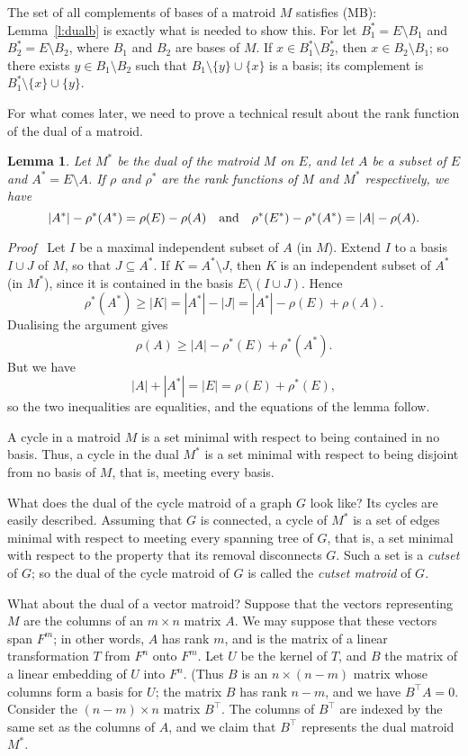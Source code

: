\documentclass[12pt]{article}
\newtheorem{lemma}[theorem]{Lemma}
\newcommand{\head}[1]{\medbreak\noindent\textit{#1}\ }
\begin{document}
\medbreak

The set of all complements of bases of a matroid $M$ satisfies (MB):
Lemma~\ref{l:dualb} is exactly what is needed to show this. For let
$B_1^*=E\setminus B_1$ and $B_2^*=E\setminus B_2$, where $B_1$
and $B_2$ are bases of $M$. If $x\in B_1^*\setminus B_2^*$, then
$x\in B_2\setminus B_1$; so there exists $y\in B_1\setminus B_2$
such that $B_1\setminus\{y\}\cup\{x\}$ is a basis; its
complement is $B_1^*\setminus\{x\}\cup\{y\}$.

For what comes later, we need to prove a technical result about
the rank function of the dual of a matroid.

\begin{lemma}
Let $M^*$ be the dual of the matroid $M$ on $E$, and let $A$ be
a subset of $E$ and $A^*=E\setminus A$. If $\rho$ and $\rho^*$
are the rank functions of $M$ and $M^*$ respectively, we have
\[|A^*|-\rho^*(A^*)=\rho(E)-\rho(A)\quad\hbox{and}\quad
\rho^*(E^*)-\rho^*(A^*)=|A|-\rho(A).\]
\label{l:dualrf}
\end{lemma}

\head{Proof} Let $I$ be a maximal independent subset of $A$ (in $M$).
Extend $I$ to a basis $I\cup J$ of $M$, so that $J\subseteq A^*$.
If $K=A^*\setminus J$, then $K$ is an independent subset of $A^*$
(in $M^*$), since it is contained in the basis $E\setminus(I\cup J)$.
Hence
\[\rho^*(A^*)\ge|K|=|A^*|-|J|=|A^*|-\rho(E)+\rho(A).\]
Dualising the argument gives
\[\rho(A)\ge|A|-\rho^*(E)+\rho^*(A^*).\]
But we have
\[|A|+|A^*|=|E|=\rho(E)+\rho^*(E),\]
so the two inequalities are equalities, and the equations of the
lemma follow.

\medbreak

A cycle in a matroid $M$ is a set minimal with respect to being
contained in no basis. Thus, a cycle in the dual $M^*$ is a set
minimal with respect to being disjoint from no basis of $M$, that
is, meeting every basis.

What does the dual of the cycle matroid of a graph $G$ look like?
Its cycles are easily described. Assuming that $G$ is connected,
a cycle of $M^*$ is a set of edges minimal with respect to
meeting every spanning tree of $G$, that is, a set minimal with
respect to the property that its removal disconnects $G$. Such a
set is a \emph{cutset} of $G$; so the dual of the cycle matroid
of $G$ is called the \emph{cutset matroid} of $G$.

What about the dual of a vector matroid? Suppose that the
vectors representing $M$ are the columns of an $m\times n$ matrix
$A$. We may suppose that these vectors span $F^m$; in other
words, $A$ has rank $m$, and is the matrix of a linear
transformation $T$ from $F^n$ onto $F^m$. Let $U$ be the kernel
of $T$, and $B$ the matrix of a linear embedding of $U$ into $F^n$.
(Thus $B$ is an $n\times(n-m)$ matrix whose columns form a basis
for $U$; the matrix $B$ has rank $n-m$, and we have $B^\top A=0$.
Consider the $(n-m)\times n$ matrix $B^\top$. The columns of
$B^\top$ are indexed by the same set as the columns of $A$, and
we claim that $B^\top$ represents the dual matroid $M^*$.
\end{document}
